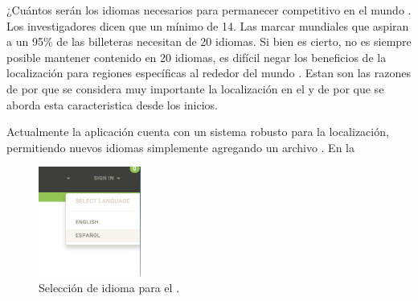 ¿Cuántos serán los idiomas necesarios para permanecer competitivo en el mundo \online. Los investigadores dicen que un mínimo de 14. Las marcar mundiales que aspiran a un 95\% de las billeteras \online necesitan de 20 idiomas. Si bien es cierto, no es siempre posible mantener contenido \online en 20 idiomas, es difícil negar los beneficios de la localización para regiones específicas al rededor del mundo \cite{online_world_global_oportunity_multi_languages}. Estan son las razones de por que se considera muy importante la localización en el \frameworkPC y de por que se aborda esta caracteristica desde los inicios.

Actualmente la aplicación cuenta con un sistema robusto para la localización, permitiendo nuevos idiomas simplemente agregando un archivo \jsonNAME. En la 


\begin{figure}[H]
	\centering
	\includegraphics[width=0.3\textwidth]{figuras/languages_available.png}

	\caption{Selección de idioma para el \websitesINT.}
	\label{figure:features:languages_available}
\end{figure}




